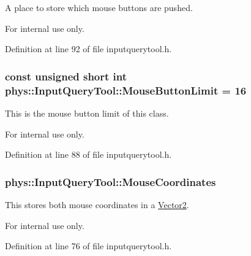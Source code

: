 A place to store which mouse buttons are pushed. 

\begin{DoxyInternal}{For internal use only.}
\end{DoxyInternal}


Definition at line 92 of file inputquerytool.h.

\hypertarget{classphys_1_1InputQueryTool_af5d261bc351f43222db511aacf572409}{
\subsubsection[{MouseButtonLimit}]{\setlength{\rightskip}{0pt plus 5cm}const unsigned short int {\bf phys::InputQueryTool::MouseButtonLimit} = 16}}
\label{da/d96/classphys_1_1InputQueryTool_af5d261bc351f43222db511aacf572409}


This is the mouse button limit of this class. 

\begin{DoxyInternal}{For internal use only.}
\end{DoxyInternal}


Definition at line 88 of file inputquerytool.h.

\hypertarget{classphys_1_1InputQueryTool_a379f40bdfb0cbafb84d1dcf297cb1ea3}{
\subsubsection[{MouseCoordinates}]{ {\bf phys::InputQueryTool::MouseCoordinates}}}
\label{da/d96/classphys_1_1InputQueryTool_a379f40bdfb0cbafb84d1dcf297cb1ea3}


This stores both mouse coordinates in a \hyperlink{classphys_1_1Vector2}{Vector2}. 

\begin{DoxyInternal}{For internal use only.}
\end{DoxyInternal}


Definition at line 76 of file inputquerytool.h.

